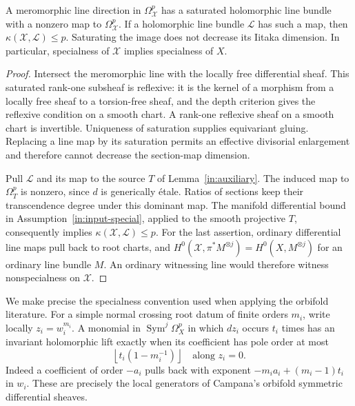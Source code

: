 \begin{lemma}
\label{in:root-bound}
A meromorphic line direction in \(\Omega^p_{\mathcal X}\) has a
saturated holomorphic line bundle with a nonzero map to
\(\Omega^p_{\mathcal X}\).  If a holomorphic line bundle
\(\mathcal L\) has such a map, then
\(\kappa(\mathcal X,\mathcal L)\le p\).  Saturating the image does not
decrease its Iitaka dimension.  In particular, specialness of
\(\mathcal X\) implies specialness of \(X\).
\end{lemma}

\begin{proof}
Intersect the meromorphic line with the locally free differential
sheaf.  This saturated rank-one subsheaf is reflexive: it is the
kernel of a morphism from a locally free sheaf to a torsion-free
sheaf, and the depth criterion gives the reflexive condition on a
smooth chart.  A rank-one reflexive sheaf on a smooth chart is
invertible.  Uniqueness of saturation supplies equivariant gluing.
Replacing a line map by its saturation permits an effective
divisorial enlargement and therefore cannot decrease the section-map
dimension.

Pull \(\mathcal L\) and its map to the source \(T\) of
Lemma~\ref{in:auxiliary}.  The induced map to \(\Omega_T^p\) is
nonzero, since \(d\) is generically \'{e}tale.  Ratios of sections keep
their transcendence degree under this dominant map.  The manifold
differential bound in Assumption~\ref{in:input-special}, applied to
the smooth projective \(T\), consequently implies
\(\kappa(\mathcal X,\mathcal L)\le p\).  For the last assertion,
ordinary differential line maps pull back to root charts, and
\(H^0(\mathcal X,\pi^*M^{\otimes j})=H^0(X,M^{\otimes j})\) for an
ordinary line bundle \(M\).  An ordinary witnessing line would
therefore witness nonspecialness on \(\mathcal X\).
\end{proof}

We make precise the specialness convention used when applying the
orbifold literature.  For a simple normal crossing root datum of
finite orders \(m_i\), write locally \(z_i=w_i^{m_i}\).  A monomial
in \(\operatorname{Sym}^j\Omega^p_X\) in which \(dz_i\) occurs
\(t_i\) times has an invariant holomorphic lift exactly when its
coefficient has pole order at most
\begin{equation}\label{in:rounding}
 \left\lfloor t_i(1-m_i^{-1})\right\rfloor
 \quad\text{along }z_i=0.
\end{equation}
Indeed a coefficient of order \(-a_i\) pulls back with exponent
\(-m_i a_i+(m_i-1)t_i\) in \(w_i\).  These are precisely the local
generators of Campana's orbifold symmetric differential sheaves.

